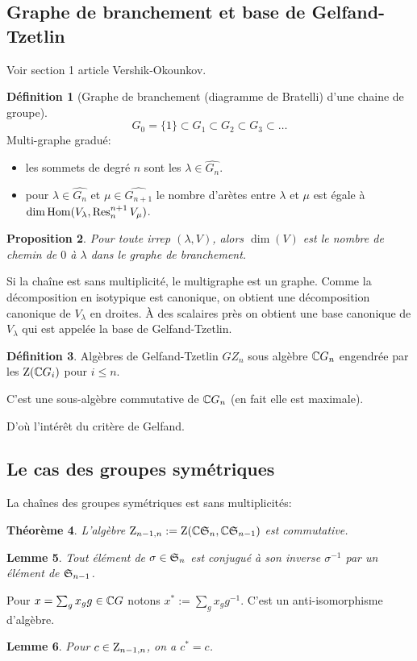 \documentclass[francais,a4paper,11pt,reqno]{amsart}
\theoremstyle{plain}
\newtheorem{THEO}{\bf Théorème}[section]
\newtheorem{PROP}[THEO]{\bf Proposition}
\newtheorem{LEMME}[THEO]{\bf Lemme}
\theoremstyle{definition}
\newtheorem{DEF}[THEO]{\bf Définition}
\theoremstyle{remark}
\begin{document}
\subsection{Graphe de branchement et base de Gelfand-Tzetlin}
Voir section 1 article Vershik-Okounkov.

\begin{DEF}[Graphe de branchement (diagramme de Bratelli) d'une chaine de
  groupe]
  \begin{equation}
    G_0=\{1\} \subset G_1 \subset G_2 \subset G_3 \subset \dots
  \end{equation}
  Multi-graphe gradué:
  \begin{itemize}
  \item les sommets de degré $n$ sont les $\lambda\in\hat{G_n}$.
  \item pour $\lambda\in\hat{G_n}$ et $\mu\in\hat{G_{n+1}}$ le nombre d'arètes
    entre $\lambda$ et $\mu$ est égale à $\dim\operatorname{Hom}(V_\lambda, \operatorname{Res}^{n+1}_nV_\mu)$.
  \end{itemize}
\end{DEF}
\begin{PROP}
  Pour toute irrep $(\lambda, V)$, alors $\dim(V)$ est le nombre de chemin de $0$
  à $\lambda$ dans le graphe de branchement.
\end{PROP}
Si la chaîne est sans multiplicité, le multigraphe est un graphe. Comme la
décomposition en isotypique est canonique, on obtient une décomposition
canonique de $V_\lambda$ en droites. À des scalaires près on obtient une base
canonique de $V_\lambda$ qui est appelée la base de Gelfand-Tzetlin.
\begin{DEF}
  Algèbres de Gelfand-Tzetlin $GZ_n$ sous algèbre ${\mathbb C} G_n$ engendrée par
  les $\operatorname{Z}({\mathbb C} G_i)$ pour $i\leq n$.
\end{DEF}
C'est une sous-algèbre commutative de ${\mathbb C} G_n$ (en fait elle est maximale).

D'où l'intérêt du critère de Gelfand.

\subsection{Le cas des groupes symétriques}

La chaînes des groupes symétriques est sans multiplicités:
\begin{THEO}
  L'algèbre $\operatorname{Z}_{n-1,n} := \operatorname{Z}({\mathbb C} {\mathfrak S}_n, {\mathbb C} {\mathfrak S}_{n-1})$ est commutative.
\end{THEO}
\begin{LEMME}
  Tout élément de $\sigma\in{\mathfrak S}_n$ est conjugué à son inverse $\sigma^{-1}$
  par un élément de ${\mathfrak S}_{n-1}$.
\end{LEMME}
Pour $x=\sum_g x_g g\in{\mathbb C} G$ notons $x^* := \sum_g x_g g^{-1}$. C'est un
anti-isomorphisme d'algèbre.
\begin{LEMME}
  Pour $c\in\operatorname{Z}_{n-1,n}$, on a $c^* = c$.
\end{LEMME}
\end{document}
